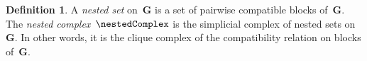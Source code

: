 \documentclass{amsart}
\newtheorem{corollary}[theorem]{Corollary}
\newtheorem{lemma}[theorem]{Lemma}
\theoremstyle{definition}
\newtheorem{definition}[theorem]{Definition}
\renewcommand{\b}[1]{{\boldsymbol{#1}}} %
\newcommand{\ssm}{\smallsetminus} %
\newcommand{\viceversa}{\textit{vice versa}} %
\newcommand{\darkblue}{\color{darkblue}} %
\newcommand{\defn}[1]{\textsl{\darkblue #1}} %
\newcommand{\vincent}[1]{\todo[color=blue!30]{#1 \\ \hfill --- V.}}
\newcommand{\negDisjoint}{\perp} %
\newcommand{\posDisjoint}{\;\top\;} %
\newcommand{\compl}[1]{#1{}^\textsc{c}} %
\begin{document}
\begin{definition}
  \label{def:spineComplex}
  A \defn{nested set} on~$\b{G}$ is a set of pairwise compatible blocks of~$\b{G}$.
  The \defn{nested complex}~$\nestedComplex$ is the simplicial complex of nested sets on~$\b{G}$.
  In other words, it is the clique complex of the compatibility relation on blocks of~$\b{G}$.
\end{definition}

%
%
%
%
\end{document}
